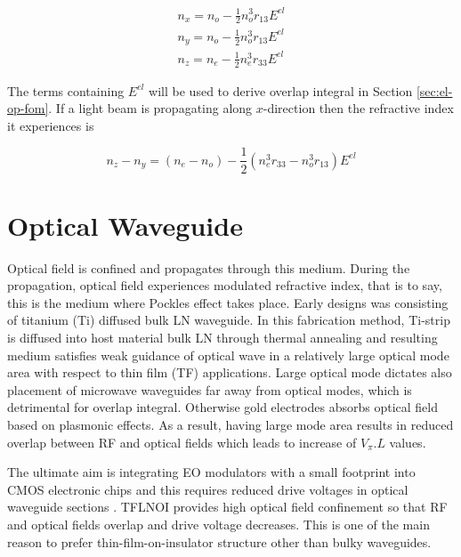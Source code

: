 \documentclass[thesis]{deutez}
\begin{document}
    \begin{subequations}\label{eq:index-ellipsoid-lengths}
    \begin{align}
        n_x = n_o- \frac{1}{2}n_o^3 r_{13}E^{el} \label{eq:index-ellipsoid-lengths-nx}\\ 
        n_y = n_o- \frac{1}{2}n_o^3 r_{13}E^{el} \label{eq:index-ellipsoid-lengths-ny}\\
        n_z = n_e- \frac{1}{2}n_e^3 r_{33}E^{el} \label{eq:index-ellipsoid-lengths-nz}
    \end{align}
    \end{subequations}

    The terms containing $E^{el}$ will be used to derive overlap integral in Section \ref{sec:el-op-fom}. If a light beam is propagating along $x$-direction then the refractive index it experiences is

    \begin{equation}
        n_z-n_y= (n_e-n_o)-\frac{1}{2}(n_e^3 r_{33}-n_o^3 r_{13})E^{el}
    \end{equation}
    
    \section{Optical Waveguide}
    
    Optical field is confined and propagates through this medium. During the propagation, optical field experiences modulated refractive index, that is to say, this is the medium where Pockles effect takes place. Early designs was consisting of titanium (Ti) diffused bulk LN waveguide. In this fabrication method, Ti-strip is diffused into host material bulk LN through thermal annealing and resulting medium satisfies weak guidance of optical wave in a relatively large optical mode area with respect to thin film (TF) applications. Large optical mode dictates also placement of microwave waveguides far away from optical modes, which is detrimental for overlap integral. Otherwise gold electrodes absorbs optical field based on plasmonic effects. As a result, having large mode area results in reduced overlap between RF and optical fields which leads to increase of $V_{\pi}.L$ values. 

    The ultimate aim is integrating EO modulators with a small footprint into CMOS electronic chips and this requires reduced drive voltages in optical waveguide sections \cite{14} \cite{15}. TFLNOI provides high optical field confinement so that RF and optical fields overlap and drive voltage decreases. This is one of the main reason to prefer thin-film-on-insulator structure other than bulky waveguides. 
\end{document}
